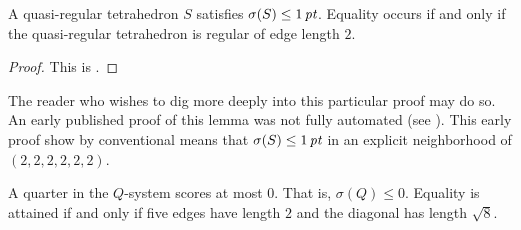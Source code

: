 \begin{lemma} \label{lemma:1pt}
A quasi-regular tetrahedron $S$ satisfies $\sigma(S)\le 1\,\hbox{\it pt}$.
Equality occurs if and only if the quasi-regular tetrahedron is
regular of edge length $2$.
%
\end{lemma}

\begin{proof}
This is .
\end{proof}

\begin{remark}  The reader who wishes to dig more deeply into this particular
proof may do so.   An early published proof of this lemma was not
fully automated (see \cite[Lemma~9.1.1]{part1}).  This early proof
show by conventional means that $\sigma(S)\le 1\,\hbox{\it pt}$ in an
explicit neighborhood of $(2,2,2,2,2,2)$.
\end{remark}

\begin{lemma} \label{lemma:quarter0}
A quarter in the $Q$-system scores at most $0$. That is,
$\sigma(Q)\le 0$. Equality is attained if and only if five edges
have length $2$ and the diagonal has length $\sqrt8$.
\end{lemma}

